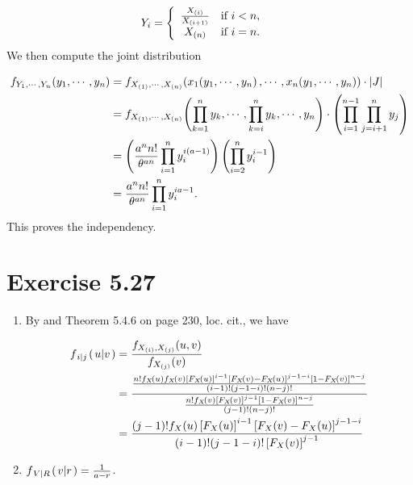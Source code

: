 \documentclass[12pt,letterpaper,reqno]{amsart}
\numberwithin{equation}{subsection}
\begin{document}
\begin{align*}
    Y_i &= \left\{ \begin{array}{cl}
         \frac{{X}_{\left( {i} \right)}}{{X}_{\left( {i+1} \right)}} & \mbox{if $i< n$},  \\
         {X}_{\left( {n} \right)}& \mbox{if $i=n$}. 
    \end{array} \right.
\end{align*}
We then compute the joint distribution

\begin{align*}
    {f_{Y_1, \cdots, Y_{n}}}\! \left( {y_1, \cdots, y_{n}} \right) &= {f_{{X}_{\left( {1} \right)}, \cdots, {X}_{\left( {n} \right)}}}\! \left( {{x_1}\! \left( {y_1, \cdots, y_n} \right), \cdots, {x_n}\! \left( {y_1, \cdots, y_n} \right)} \right) \cdot \left\lvert{J}\right\rvert \\
    &= {f_{{X}_{\left( {1} \right)}, \cdots, {X}_{\left( {n} \right)}}}\! \left( {\prod_{k=1}^n y_k, \cdots, \prod_{k=i}^n y_k, \cdots, y_n} \right) \cdot \left( \prod_{i=1}^{n-1} \prod_{j=i+1}^n y_j \right) \\
    &= \left(\frac{a^n n!}{\theta^{an}} \prod_{i=1}^n y_i^{i(a-1)}\right) \left( \prod_{i=2}^n y_{i}^{i-1} \right) \\
    &= \frac{a^n n!}{\theta^{an}} \prod_{i=1}^n y_i^{ia-1}.
\end{align*}
This proves the independency.

\newpage
\section{Exercise 5.27}

\begin{enumerate}[label=(\alph*),leftmargin=*]
    \item By \cite[Theorem 5.4.4 on page 229]{Berger-Casella} and Theorem 5.4.6 on page 230, loc. cit., we have

\begin{align*}
    \fun{f_{\conditbar{i}{j}}}{\conditbar{u}{v}} &= \frac{\fun{f_{\orderstatvar{X}{i}, \orderstatvar{X}{j}}}{u,v}}{\fun{f_{\orderstatvar{X}{j}}}{v}} \\
    &= \frac{\frac{n! \fun{f_X}{u} \fun{f_X}{v} \left[ \fun{F_X}{u} \right]^{i-1} \left[ \fun{F_X}{v} - \fun{F_X}{u} \right]^{j-1-i} \left[ 1 - \fun{F_X}{v} \right]^{n-j}}{(i-1)!(j-1-i)!(n-j)!}}{\frac{n! \fun{f_X}{v} \left[ \fun{F_X}{v} \right]^{j-1} \left[ 1 - \fun{F_X}{v} \right]^{n-j}}{(j-1)!(n-j)!}} \\
    &= \frac{(j-1)! \fun{f_X}{u} \left[ \fun{F_X}{u} \right]^{i-1} \left[ \fun{F_X}{v} - \fun{F_X}{u} \right]^{j-1-i}}{(i-1)!(j-1-i)! \left[ \fun{F_X}{v} \right]^{j-1}}
\end{align*}

\item ${f_{\left. {V} \middle| {R} \right.}}\! \left( {\left. {v} \middle| {r} \right.} \right) = \frac{1}{a-r}$.
\end{enumerate}

\newpage
\nocite{*}
\printbibliography
\end{document}
